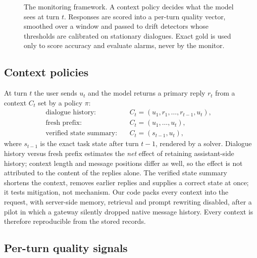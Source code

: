 \begin{figure}[!htbp]
\caption{The monitoring framework. A context policy decides what the model
sees at turn $t$. Responses are scored into a per-turn quality vector, smoothed
over a window and passed to drift detectors whose thresholds are calibrated on
stationary dialogues. Exact gold is used only to score accuracy and evaluate
alarms, never by the monitor.}
\label{fig:framework}
\end{figure}

\subsection{Context policies}

At turn $t$ the user sends $u_t$ and the model returns a primary reply $r_t$
from a context $C_t$ set by a policy $\pi$:
\begin{align}
  \text{dialogue history:}\quad & C_t = (u_1, r_1, \dots, r_{t-1}, u_t),\\
  \text{fresh prefix:}\quad & C_t = (u_1, \dots, u_t),\\
  \text{verified state summary:}\quad & C_t = (s_{t-1}, u_t),
\end{align}
where $s_{t-1}$ is the exact task state after turn $t-1$, rendered by a
solver. Dialogue history versus fresh prefix estimates the \emph{net} effect of
retaining assistant-side history; context length and message positions differ
as well, so the effect is not attributed to the content of the replies alone.
The verified state summary shortens the context, removes earlier replies and
supplies a correct state at once; it tests mitigation, not mechanism. Our code
packs every context into the request, with server-side memory, retrieval and
prompt rewriting disabled, after a pilot in which a gateway silently dropped
native message history. Every context is therefore reproducible from the
stored records.

\subsection{Per-turn quality signals}

